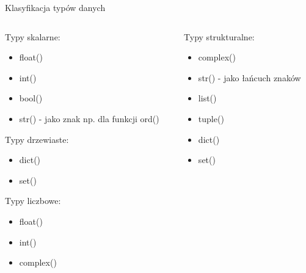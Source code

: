 \begin{frame}{Klasyfikacja typów danych}
    \begin{columns}
        \begin{column}{0.5\textwidth}
            Typy skalarne:
            \begin{itemize}
                \item float() \\
                \item int() \\
                \item bool() \\
                \item str() - jako znak np. dla funkcji ord() \\
            \end{itemize}
            Typy drzewiaste:
            \begin{itemize}
                \item dict() \\
                \item set() \\
            \end{itemize}
            Typy liczbowe:
            \begin{itemize}
                \item float() \\
                \item int() \\
                \item complex() \\
            \end{itemize}            
        \end{column}
        \begin{column}{0.5\textwidth}
            Typy strukturalne:
            \begin{itemize}
                \item complex() \\
                \item str() - jako łańcuch znaków \\
                \item list() \\
                \item tuple() \\
                \item dict() \\
                \item set() \\

\end{itemize}
\end{column}
\end{columns}
\end{frame}
